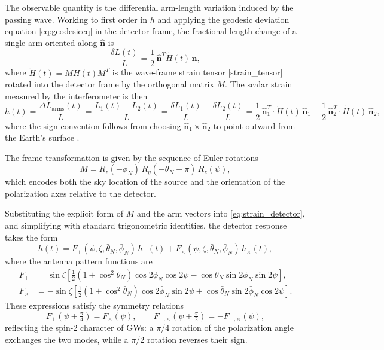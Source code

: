 The observable quantity is the differential arm-length variation induced by the passing wave. Working to first order in $h$ and applying the geodesic deviation equation \eqref{eq:geodesiceq} in the detector frame, the fractional length change of a single arm oriented along 
$\hat{\mathbf{n}}$ is
\begin{equation}
    \frac{\delta L(t)}{L} = \frac{1}{2}\,\hat{\mathbf{n}}^{T}
    \tilde{H}(t)\,\hat{\mathbf{n}},
\end{equation}
where $\tilde{H}(t) = M H(t) M^T$ is the wave-frame strain tensor \eqref{strain_tensor} rotated into the detector frame by the orthogonal matrix $M$. The scalar strain measured by the interferometer is then
\begin{equation}
    h(t)= \frac{\Delta L_{\text{arms}}(t)}{L}=\frac{L_1(t)-L_2(t)}{L}=\frac{\delta L_1(t)}{L}-\frac{\delta L_2(t)}{L}=\frac{1}{2}\,\hat{\mathbf{n}}_1^T \cdot \tilde{H}(t)\,\hat{\mathbf{n}}_1 - \frac{1}{2}\,\hat{\mathbf{n}}_2^T \cdot \tilde{H}(t)\,\hat{\mathbf{n}}_2 ,
    \label{eq:strain_detector}
\end{equation}
where the sign convention follows from choosing 
$\hat{\mathbf{n}}_1 \times \hat{\mathbf{n}}_2$ to point outward from the Earth's surface \cite{PhysRevD.58.063001}.

The frame transformation is given by the sequence of Euler rotations
\begin{equation}
    M = R_z(-\bar{\phi}_N)\,R_y(-\bar{\theta}_N+\pi)\,R_z(\psi),
\end{equation}
which encodes both the sky location of the source and the orientation of the polarization axes relative to the detector.


Substituting the explicit form of $M$ and the arm vectors into \eqref{eq:strain_detector}, and simplifying with standard trigonometric identities, the detector response takes the form
\begin{equation}
    h(t) = F_{+}(\psi,\zeta,\bar{\theta}_N,\bar{\phi}_N)\,h_+(t)
          + F_{\times}(\psi,\zeta,\bar{\theta}_N,\bar{\phi}_N)\,h_\times(t),
    \label{eq:hoft}
\end{equation}
where the antenna pattern functions are \cite{TriasCornellana2011GW, 
PhysRevD.58.063001}
\begin{align}
F_{+} &= \sin\zeta\left[
    \frac{1}{2}(1+\cos^2\bar{\theta}_N)\cos 2\bar{\phi}_N\cos 2\psi
    - \cos\bar{\theta}_N\sin 2\bar{\phi}_N\sin 2\psi
    \right], \label{eq:Fplus} \\[4pt]
F_{\times} &= -\sin\zeta\left[
    \frac{1}{2}(1+\cos^2\bar{\theta}_N)\cos 2\bar{\phi}_N\sin 2\psi
    + \cos\bar{\theta}_N\sin 2\bar{\phi}_N\cos 2\psi
    \right]. \label{eq:Fcross}
\end{align}
These expressions satisfy the symmetry relations
\begin{equation}
    F_{+}\!\left(\psi+\tfrac{\pi}{4}\right) = F_{\times}(\psi),
    \qquad
    F_{+,\times}\!\left(\psi+\tfrac{\pi}{2}\right) = -F_{+,\times}(\psi),
\end{equation}
reflecting the spin-2 character of GWs: a $\pi/4$ rotation of the polarization angle exchanges the two modes, while a $\pi/2$ rotation reverses their sign.


